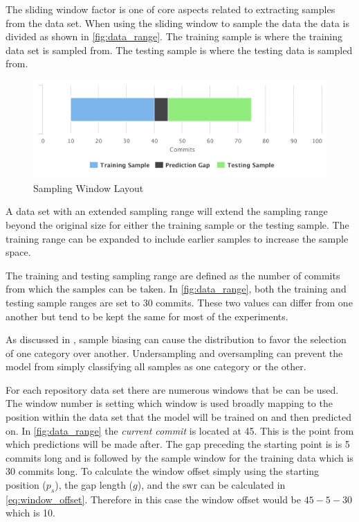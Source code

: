 
The sliding window factor is one of core aspects related to extracting samples from the data set. When using the sliding window to sample the data the data is divided as shown in \autoref{fig:data_range}. The training sample is where the training data set is sampled from. The testing sample is where the testing data is sampled from. 

\begin{figure}[!ht]
    \centering
        \includegraphics[width=1.0\textwidth]{images/exp_data_range}
    \caption{Sampling Window Layout}
    \label{fig:data_range}
\end{figure}


A data set with an extended sampling range will extend the sampling range beyond the original size for either the training sample or the testing sample. The training range can be expanded to include earlier samples to increase the sample space.

The training and testing sampling range are defined as the number of commits from which the samples can be taken. In \autoref{fig:data_range}, both the training and testing sample ranges are set to 30 commits. These two values can differ from one another but tend to be kept the same for most of the experiments.

As discussed in , sample biasing can cause the distribution to favor the selection of one category over another. Undersampling and oversampling can prevent the model from simply classifying all samples as one category or the other.

For each repository data set there are numerous windows that be can be used. The window number is setting which window is used broadly mapping to the position within the data set that the model will be trained on and then predicted on. In \autoref{fig:data_range} the \textit{current commit} is located at 45. This is the point from which predictions will be made after. The gap preceding the starting point is is 5 commits long and is followed by the sample window for the training data which is 30 commits long. To calculate the window offset simply using the starting position ($p_s$), the gap length ($g$), and the \gls{swr} can be calculated in \autoref{eq:window_offset}. Therefore in this case the window offset would be $45 - 5 - 30$ which is 10.

